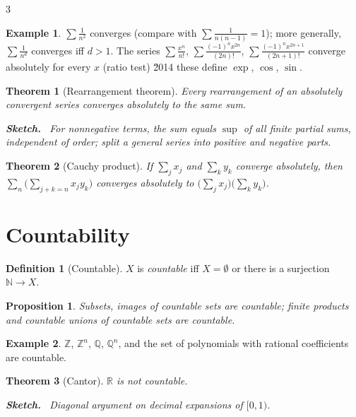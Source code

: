 \documentclass[10pt,a4paper,landscape]{article}
\theoremstyle{definition}
\newtheorem{defn}{Definition}[section]
\newtheorem{exm}{Example}[section]
\theoremstyle{plain}
\newtheorem{thm}{Theorem}[section]
\newtheorem{prop}{Proposition}[section]
\theoremstyle{remark}
\newcommand{\R}{\mathbb{R}}
\newcommand{\N}{\mathbb{N}}
\newcommand{\Z}{\mathbb{Z}}
\newcommand{\Q}{\mathbb{Q}}
\newenvironment{proofsketch}{%
  \par\small\color{exgray}\textbf{Sketch.}\ }%
  {\par}
\begin{document}
\begin{multicols*}{3}
\begin{exm}
$\sum \frac{1}{n^2}$ converges (compare with $\sum \frac{1}{n(n-1)} = 1$); more generally, $\sum \frac{1}{n^d}$ converges iff $d > 1$. The series $\sum \frac{x^n}{n!}$, $\sum \frac{(-1)^n x^{2n}}{(2n)!}$, $\sum \frac{(-1)^n x^{2n+1}}{(2n+1)!}$ converge absolutely for every $x$ (ratio test) \u2014 these define $\exp$, $\cos$, $\sin$.
\end{exm}

\begin{thm}[Rearrangement theorem]
Every rearrangement of an absolutely convergent series converges absolutely to the same sum.
\begin{proofsketch}
For nonnegative terms, the sum equals $\sup$ of all finite partial sums, independent of order; split a general series into positive and negative parts.
\end{proofsketch}
\end{thm}

\begin{thm}[Cauchy product]
If $\sum_j x_j$ and $\sum_k y_k$ converge absolutely, then $\sum_{n} \bigl(\sum_{j+k=n} x_j y_k\bigr)$ converges absolutely to $\bigl(\sum_j x_j\bigr)\bigl(\sum_k y_k\bigr)$.
\end{thm}

\section{Countability}

\begin{defn}[Countable]
$X$ is \emph{countable} iff $X = \emptyset$ or there is a surjection $\N \to X$.
\end{defn}

\begin{prop}
Subsets, images of countable sets are countable; finite products and countable unions of countable sets are countable.
\end{prop}

\begin{exm}
$\Z$, $\Z^n$, $\Q$, $\Q^n$, and the set of polynomials with rational coefficients are countable.
\end{exm}

\begin{thm}[Cantor]
$\R$ is not countable.
\begin{proofsketch}
Diagonal argument on decimal expansions of $[0,1)$.
\end{proofsketch}
\end{thm}


\end{multicols*}
\end{document}
